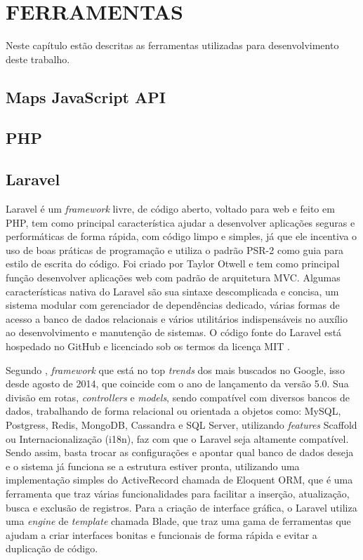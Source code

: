 
\chapter{FERRAMENTAS}
Neste capítulo estão descritas as ferramentas utilizadas para desenvolvimento deste
trabalho.

\section{Maps JavaScript API}

\section{PHP}

\section{Laravel}
Laravel é um \textit{framework} livre, de código aberto, voltado para web e feito em PHP, tem como principal característica ajudar a desenvolver aplicações seguras e performáticas de forma rápida, com código limpo e simples, já que ele incentiva o uso de boas práticas de programação e utiliza o padrão PSR-2 como guia para estilo de escrita do código. Foi criado por Taylor Otwell e tem como principal função desenvolver aplicações web com padrão de arquitetura MVC. Algumas características nativa do Laravel são sua sintaxe descomplicada e concisa, um sistema modular com gerenciador de dependências dedicado, várias formas de acesso a banco de dados relacionais e vários utilitários indispensáveis no auxílio ao desenvolvimento e manutenção de sistemas. O código fonte do Laravel está hospedado no GitHub e licenciado sob os termos da licença MIT \cite{portalgsti:laravel}. 

Segundo , \textit{framework} que está no top \textit{trends} dos mais buscados no Google, isso desde agosto de 2014, que coincide com o ano de lançamento da versão 5.0. Sua divisão em rotas, \textit{controllers} e \textit{models}, sendo compatível com diversos bancos de dados, trabalhando de forma relacional ou orientada a objetos como: MySQL, Postgress, Redis, MongoDB, Cassandra e SQL Server, utilizando \textit{features} Scaffold ou Internacionalização (i18n), faz com que o Laravel seja altamente compatível. Sendo assim, basta trocar as configurações e apontar qual banco de dados deseja e o sistema já funciona se a estrutura estiver pronta, utilizando uma implementação simples do ActiveRecord chamada de Eloquent ORM, que é uma ferramenta que traz várias funcionalidades para facilitar a inserção, atualização, busca e exclusão de registros. Para a criação de interface gráfica, o Laravel utiliza uma \textit{engine} de \textit{template} chamada Blade, que traz uma gama de ferramentas que ajudam a criar interfaces bonitas e funcionais de forma rápida e evitar a duplicação de código.

